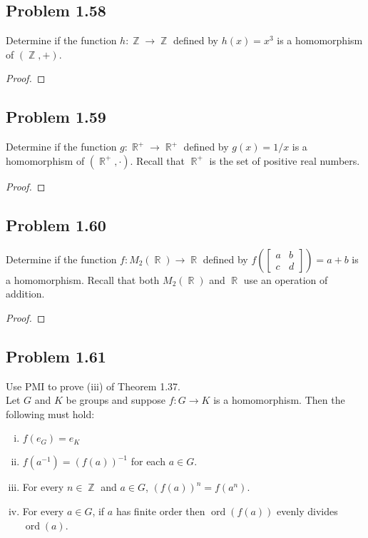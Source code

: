 \documentclass{amsbook}
\DeclareMathOperator{\ord}{\text{ord}}
\DeclareMathOperator{\Z}{\mathbb{Z}}
\DeclareMathOperator{\R}{\mathbb{R}}
\begin{document}
			\subsection*{Problem 1.58}
			\label{sub:problem_1_58}
			Determine if the function $h : \Z \to \Z$ defined by $h(x) = x^{3}$ is a homomorphism of $(\Z, +)$.
			\begin{proof}
			\end{proof}

			\subsection*{Problem 1.59}
			\label{sub:problem_1_59}
			Determine if the function $g : \R^{+} \to \R^{+}$ defined by $g(x) = 1/x$ is a homomorphism of $(\R^{+},\cdot)$. 
			Recall that $\R^{+}$ is the set of positive real numbers.
			\begin{proof}
			\end{proof}

			\subsection*{Problem 1.60}
			\label{sub:problem_1_60}
			Determine if the function $f : M_{2}(\R) \to \R$ defined by $f\left( \begin{bmatrix} a & b \\ c & d \end{bmatrix} \right) = a + b$ is a homomorphism. 
			Recall that both $M_{2}(\R)$ and $\R$ use an operation of addition.
			\begin{proof}
			\end{proof}

			\subsection*{Problem 1.61}
			\label{sub:problem_1_61}
			Use PMI to prove (iii) of Theorem 1.37.\\

			 Let $G$ and $K$ be groups and suppose $f: G \to K$ is a homomorphism. 
			Then the following must hold:
			\begin{enumerate}[(i)]
				\item $f(e_{G}) = e_{K}$
				\item $f\left( a^{-1} \right) = \left( f(a) \right)^{-1}$ for each $a \in G$.
				\item For every $n \in \Z$ and $a \in G$, $\left( f(a) \right)^{n} = f\left( a^{n} \right)$.
				\item For every $a \in G$, if $a$ has finite order then $\ord(f(a))$ evenly divides $\ord(a)$.
			\end{enumerate}
			
\end{document}
